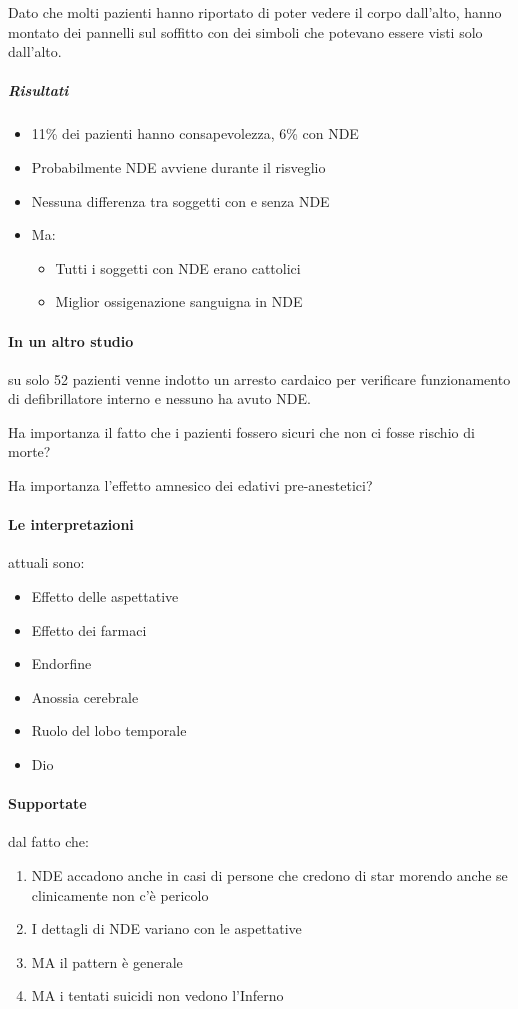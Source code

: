 \documentclass[12pt, a4paper]{article}
\begin{document}
Dato che molti pazienti hanno riportato di poter vedere il corpo dall'alto, hanno montato dei pannelli sul soffitto con dei simboli che potevano essere visti solo dall'alto.

\subparagraph{Risultati} 
\begin{itemize}
    \item 11\% dei pazienti hanno consapevolezza, 6\% con NDE
    \item Probabilmente NDE avviene durante il risveglio
    \item Nessuna differenza tra soggetti con e senza NDE
    \item Ma:
        \begin{itemize}
            \item Tutti i soggetti con NDE erano cattolici
            \item Miglior ossigenazione sanguigna in NDE
        \end{itemize}
\end{itemize}

\paragraph{In un altro studio} su solo 52 pazienti venne indotto un arresto cardaico per verificare funzionamento di defibrillatore interno e nessuno ha avuto NDE\@.

Ha importanza il fatto che i pazienti fossero sicuri che non ci fosse rischio di morte?

Ha importanza l'effetto amnesico dei edativi pre-anestetici?

\paragraph{Le interpretazioni} attuali sono:

\begin{itemize}
    \item Effetto delle aspettative
    \item Effetto dei farmaci
    \item Endorfine
    \item Anossia cerebrale
    \item Ruolo del lobo temporale
    \item Dio
\end{itemize}

\paragraph{Supportate} dal fatto che:

\begin{enumerate}
    \item NDE accadono anche in casi di persone che credono di star morendo anche se clinicamente non c'\`e pericolo
    \item I dettagli di NDE variano con le aspettative
    \item MA il pattern \`e generale
    \item MA i tentati suicidi non vedono l'Inferno
\end{enumerate}
\end{document}
